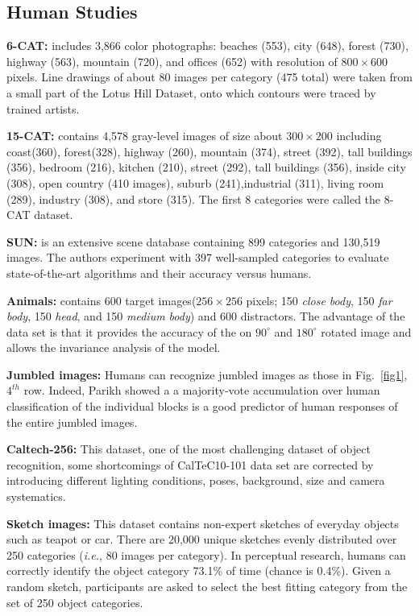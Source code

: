 \documentclass[10pt,twocolumn,letterpaper]{article}
\begin{document}
\subsection{Human Studies}
\noindent \textbf{6-CAT:}\cite{2011Simple} includes 3,866 color photographs: beaches (553), city (648), forest (730), highway (563), mountain (720), and offices (652) with resolution of $800 \times 600$ pixels. Line drawings of about 80 images per category (475 total) were taken from a small part of the Lotus Hill Dataset, onto which contours were traced by trained artists.
\par
\noindent \textbf{15-CAT:}\cite{2006Finding} contains 4,578 gray-level images of size about $300 \times 200$ including coast(360), forest(328), highway (260), mountain (374), street (392), tall buildings (356), bedroom (216), kitchen (210), street (292), tall buildings (356), inside city (308), open country (410 images), suburb (241),industrial (311), living room (289), industry (308), and store (315). The first 8 categories were called the 8-CAT dataset.
\par
\noindent \textbf{SUN:}\cite{Xiao2010SUN} is an extensive scene database containing 899 categories and 130,519 images. The authors experiment with 397 well-sampled categories to evaluate state-of-the-art algorithms and their accuracy versus humans.
\par
\noindent \textbf{Animals:}\cite{Serre2007A} contains 600 target images($256 \times 256$ pixels; 150 \emph{close body}, 150 \emph{far body}, 150 \emph{head}, and 150 \emph{medium body}) and 600 distractors. The advantage of the data set is that it provides the accuracy of the on $90^{\circ}$ and $180^{\circ}$ rotated image and allows the invariance analysis of the model.
\par
\noindent \textbf{Jumbled images:}\cite{2011Recognizing} Humans can recognize jumbled images as those in Fig.~\ref{fig1}, $4^{th}$ row. Indeed, Parikh\cite{2011Recognizing} showed a a majority-vote accumulation over human classification of the individual blocks is a good predictor of human responses of the entire jumbled images.
\par
\noindent \textbf{Caltech-256:}\cite{Griffin2007Caltech} This dataset, one of the most challenging dataset of object recognition, some shortcomings of CalTeC10-101 data set are corrected by introducing different lighting conditions, poses, background, size and camera systematics.
\par
\noindent \textbf{Sketch images:}\cite{Humans2012} This dataset contains non-expert sketches of everyday objects such as teapot or car. There are 20,000 unique sketches evenly distributed over 250 categories (\emph{i.e.}, 80 images per category). 
In perceptual research, humans can correctly identify the object category 73.1\% of time (chance is 0.4\%). Given a random sketch, participants are asked to select the best fitting category from the set of 250 object categories.
\par

{\small


}

 
\end{document}
